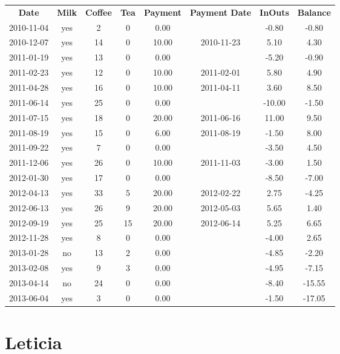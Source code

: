 \begin{center}
\begin{tabular}{cccccccc}
\textbf{Date} & \textbf{Milk} & \textbf{Coffee} & \textbf{Tea} & \textbf{Payment} & \textbf{Payment Date} & \textbf{InOuts} & \textbf{Balance} \\
2010-11-04 & yes &  2 &  0 &  0.00 &  &  -0.80 &  -0.80\\ 
2010-12-07 & yes & 14 &  0 & 10.00 & 2010-11-23 &   5.10 &   4.30\\ 
2011-01-19 & yes & 13 &  0 &  0.00 &  &  -5.20 &  -0.90\\ 
2011-02-23 & yes & 12 &  0 & 10.00 & 2011-02-01 &   5.80 &   4.90\\ 
2011-04-28 & yes & 16 &  0 & 10.00 & 2011-04-11 &   3.60 &   8.50\\ 
2011-06-14 & yes & 25 &  0 &  0.00 &  & -10.00 &  -1.50\\ 
2011-07-15 & yes & 18 &  0 & 20.00 & 2011-06-16 &  11.00 &   9.50\\ 
2011-08-19 & yes & 15 &  0 &  6.00 & 2011-08-19 &  -1.50 &   8.00\\ 
2011-09-22 & yes &  7 &  0 &  0.00 &  &  -3.50 &   4.50\\ 
2011-12-06 & yes & 26 &  0 & 10.00 & 2011-11-03 &  -3.00 &   1.50\\ 
2012-01-30 & yes & 17 &  0 &  0.00 &  &  -8.50 &  -7.00\\ 
2012-04-13 & yes & 33 &  5 & 20.00 & 2012-02-22 &   2.75 &  -4.25\\ 
2012-06-13 & yes & 26 &  9 & 20.00 & 2012-05-03 &   5.65 &   1.40\\ 
2012-09-19 & yes & 25 & 15 & 20.00 & 2012-06-14 &   5.25 &   6.65\\ 
2012-11-28 & yes &  8 &  0 &  0.00 &  &  -4.00 &   2.65\\ 
2013-01-28 & no & 13 &  2 &  0.00 &  &  -4.85 &  -2.20\\ 
2013-02-08 & yes &  9 &  3 &  0.00 &  &  -4.95 &  -7.15\\ 
2013-04-14 & no & 24 &  0 &  0.00 &  &  -8.40 & -15.55\\ 
2013-06-04 & yes &  3 &  0 &  0.00 &  &  -1.50 & -17.05
\end{tabular}
\end{center}

\section{Leticia}

